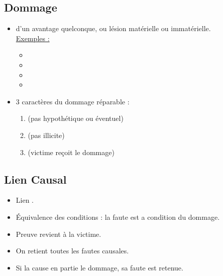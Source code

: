 \subsection{Dommage}
\begin{itemize}
	\item {} d'un avantage quelconque, ou lésion matérielle ou immatérielle.\\
	\underline{Exemples :}
	\begin{itemize}
		\item {}
		\item {}
		\item {}
		\item {}
	\end{itemize}
	\item 3 caractères du dommage réparable :
	\begin{enumerate}
		\item {} (pas hypothétique ou éventuel)
		\item {} (pas illicite)
		\item {} (victime reçoit le dommage)
	\end{enumerate}
\end{itemize}

\subsection{Lien Causal}
\begin{itemize}
	\item Lien .
	\item Équivalence des conditions : la faute est a condition du dommage.
	\item Preuve revient à la victime.
	\item On retient toutes les fautes causales.
	\item Si la  cause en partie le dommage, sa faute est retenue.
\end{itemize}


